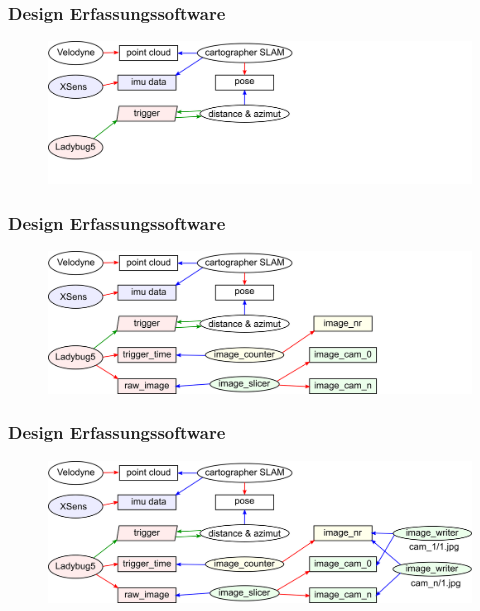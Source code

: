 \documentclass[aspectratio=169]{beamer}
\begin{document}
\begin{frame}
\frametitle{Design Erfassungssoftware}
     \begin{figure}[h]
       \centering
       \includegraphics[width=13.5cm]{./Abbildungen/ROSImageCapturing_2.png}
     \end{figure}
\end{frame}

\begin{frame}
\frametitle{Design Erfassungssoftware}
     \begin{figure}[h]
       \centering
       \includegraphics[width=13.5cm]{./Abbildungen/ROSImageCapturing_3.png}
     \end{figure}
\end{frame}

\begin{frame}
\frametitle{Design Erfassungssoftware}
     \begin{figure}[h]
       \centering
       \includegraphics[width=13.5cm]{./Abbildungen/ROSImageCapturing_4.png}
     \end{figure}
\end{frame}

\begin{frame}[plain]
\end{frame}
\end{document}
